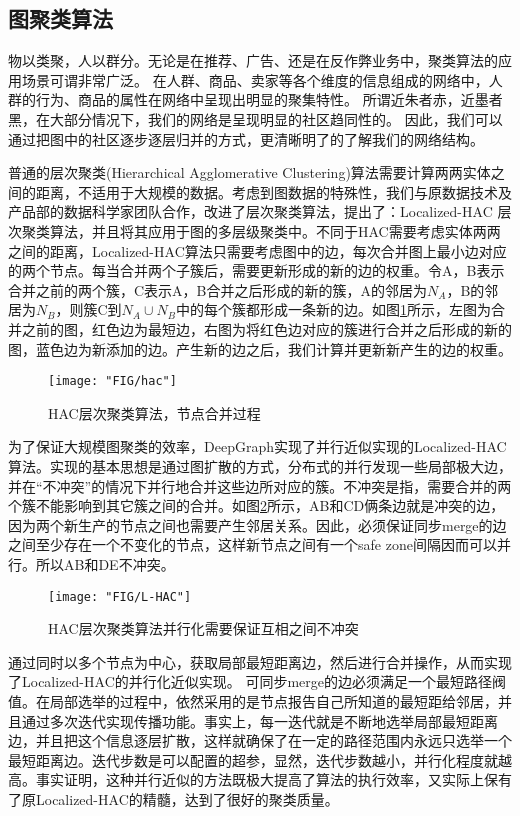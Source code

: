\subsection{图聚类算法}

物以类聚，人以群分。无论是在推荐、广告、还是在反作弊业务中，聚类算法的应用场景可谓非常广泛。
在人群、商品、卖家等各个维度的信息组成的网络中，人群的行为、商品的属性在网络中呈现出明显的聚集特性。
所谓近朱者赤，近墨者黑，在大部分情况下，我们的网络是呈现明显的社区趋同性的。
因此，我们可以通过把图中的社区逐步逐层归并的方式，更清晰明了的了解我们的网络结构。

普通的层次聚类(Hierarchical Agglomerative Clustering)算法需要计算两两实体之间的距离，不适用于大规模的数据。考虑到图数据的特殊性，我们与原数据技术及产品部的数据科学家团队合作，改进了层次聚类算法，提出了：Localized-HAC 层次聚类算法，并且将其应用于图的多层级聚类中。不同于HAC需要考虑实体两两之间的距离，Localized-HAC算法只需要考虑图中的边，每次合并图上最小边对应的两个节点。每当合并两个子簇后，需要更新形成的新的边的权重。令A，B表示合并之前的两个簇，C表示A，B合并之后形成的新的簇，A的邻居为$N_A$，B的邻居为$N_B$，则簇C到$N_A\cup N_B$中的每个簇都形成一条新的边。如图\ref{fig:chap12_hac}所示，左图为合并之前的图，红色边为最短边，右图为将红色边对应的簇进行合并之后形成的新的图，蓝色边为新添加的边。产生新的边之后，我们计算并更新新产生的边的权重。

\begin{figure}[h]
	\centering
	\texttt{[image: "FIG/hac"]}
	\caption{HAC层次聚类算法，节点合并过程}
	\label{fig:chap12_hac}
\end{figure}



为了保证大规模图聚类的效率，DeepGraph实现了并行近似实现的Localized-HAC算法。实现的基本思想是通过图扩散的方式，分布式的并行发现一些局部极大边，并在“不冲突”的情况下并行地合并这些边所对应的簇。不冲突是指，需要合并的两个簇不能影响到其它簇之间的合并。如图\ref{fig:chap12_l_hac}所示，AB和CD俩条边就是冲突的边，因为两个新生产的节点之间也需要产生邻居关系。因此，必须保证同步merge的边之间至少存在一个不变化的节点，这样新节点之间有一个safe zone间隔因而可以并行。所以AB和DE不冲突。

\begin{figure}
	\centering
	\texttt{[image: "FIG/L-HAC"]}
	\caption{HAC层次聚类算法并行化需要保证互相之间不冲突}
	\label{fig:chap12_l_hac}
\end{figure}


通过同时以多个节点为中心，获取局部最短距离边，然后进行合并操作，从而实现了Localized-HAC的并行化近似实现。
可同步merge的边必须满足一个最短路径阀值。在局部选举的过程中，依然采用的是节点报告自己所知道的最短距给邻居，并且通过多次迭代实现传播功能。事实上，每一迭代就是不断地选举局部最短距离边，并且把这个信息逐层扩散，这样就确保了在一定的路径范围内永远只选举一个最短距离边。迭代步数是可以配置的超参，显然，迭代步数越小，并行化程度就越高。事实证明，这种并行近似的方法既极大提高了算法的执行效率，又实际上保有了原Localized-HAC的精髓，达到了很好的聚类质量。

